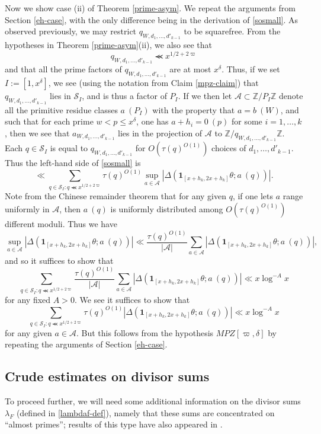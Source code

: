 \documentclass{bmcart}
\theoremstyle{plain}
\theoremstyle{definition}
\newcommand\Z{\mathbb{Z}}
\newcommand\Scal{\mathcal{S}}
\renewcommand{\lessapprox}{\llcurly}
\newcommand{\onef}{\mathbf{1}}
\begin{document}
Now we show case (ii) of Theorem \ref{prime-asym}.  We repeat the arguments from Section \ref{eh-case}, with the only difference being in the derivation of \eqref{sosmall}.  As observed previously, we may restrict $q_{W,d_1,\dots,d'_{k-1}}$ to be squarefree.  From the hypotheses in Theorem \ref{prime-asym}(ii), we also see that
$$ q_{W,d_1,\dots,d'_{k-1}} \lessapprox x^{1/2+2\varpi}$$
and that all the prime factors of $q_{W,d_1,\dots,d'_{k-1}}$ are at most $x^\delta$.  Thus, if we set $I := [1,x^\delta]$, we see (using the notation from Claim \ref{mpz-claim}) that $q_{W,d_1,\dots,d'_{k-1}}$ lies in $\Scal_I$, and is thus a factor of $P_I$.  If we then let ${\mathcal A} \subset \Z/P_I\Z$ denote all the primitive residue classes $a\ (P_I)$ with the property that $a = b\ (W)$, and such that for each prime $w < p \leq x^\delta$, one has $a + h_i = 0\ (p)$ for some $i=1,\dots,k$, then we see that $a_{W,d_1,\dots,d'_{k-1}}$ lies in the projection of ${\mathcal A}$ to $\Z/q_{W,d_1,\dots,d'_{k-1}}\Z$.  Each $q \in \Scal_I$ is equal to $q_{W,d_1,\dots,d'_{k-1}}$ for $O(\tau(q)^{O(1)})$ choices of $d_1,\dots,d'_{k-1}$.  Thus the left-hand side of \eqref{sosmall} is
$$ \ll \sum_{q \in \Scal_I: q \lessapprox x^{1/2+2\varpi}} \tau(q)^{O(1)} \sup_{a \in {\mathcal A}}
|\Delta( \onef_{[x+h_k,2x+h_k]} \theta;  a\ (q))|.$$
Note from the Chinese remainder theorem that for any given $q$, if one lets $a$ range uniformly in ${\mathcal A}$, then $a\ (q)$ is uniformly distributed among $O( \tau(q)^{O(1)})$ different moduli.  Thus we have
$$
\sup_{a \in {\mathcal A}}
|\Delta( \onef_{[x+h_k,2x+h_k]} \theta;  a\ (q))| \ll \frac{\tau(q)^{O(1)}}{|{\mathcal A}|} \sum_{a \in {\mathcal A}} |\Delta( \onef_{[x+h_k,2x+h_k]} \theta;  a\ (q))|, $$
and so it suffices to show that
$$
\sum_{q \in \Scal_I: q \lessapprox x^{1/2+2\varpi}} \frac{\tau(q)^{O(1)}}{|{\mathcal A}|} \sum_{a \in {\mathcal A}}
|\Delta( \onef_{[x+h_k,2x+h_k]} \theta;  a\ (q))|\ll x \log^{-A} x$$
for any fixed $A>0$.  We see it suffices to show that
$$
\sum_{q \in \Scal_I: q \lessapprox x^{1/2+2\varpi}} \tau(q)^{O(1)}
|\Delta( \onef_{[x+h_k,2x+h_k]} \theta;  a\ (q))|\ll x \log^{-A} x$$
for any given $a \in {\mathcal A}$.  But this follows from the hypothesis $MPZ[\varpi,\delta]$ by repeating the arguments of Section \ref{eh-case}.

\subsection{Crude estimates on divisor sums}

To proceed further, we will need some additional information on the divisor sums $\lambda_F$ (defined in \eqref{lambdaf-def}), namely that these sums are concentrated on ``almost primes''; results of this type have also appeared in \cite{pintz-szemeredi}.
\end{document}
